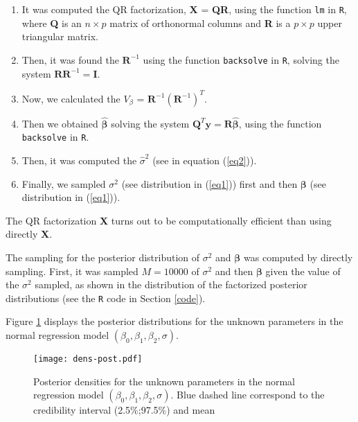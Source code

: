 \documentclass[a4paper, 11pt]{article}
\begin{document}
\begin{enumerate}
\item It was computed the QR factorization, \textbf{X} = \textbf{Q}\textbf{R}, using the function \texttt{lm} in \texttt{R}, where \textbf{Q} is an $n \times p$ matrix of orthonormal columns and \textbf{R} is a $p \times p$ upper triangular matrix.
\item Then, it was found the $\textbf{R}^{-1}$ using the function \texttt{backsolve} in \texttt{R}, solving the system $\textbf{R}\textbf{R}^{-1} = \textbf{I}$.
\item Now, we calculated the $V_\beta$ = $\textbf{R}^{-1} (\textbf{R}^{-1})^T$.
\item Then we obtained $\boldsymbol{\hat{\beta}}$ solving the system $\textbf{Q}^T\textbf{y} = \textbf{R}\boldsymbol{\hat{\beta}}$, using the function \texttt{backsolve} in \texttt{R}.
\item Then, it was computed the $\hat{\sigma}^2$ (see in equation (\ref{eq2})).
\item Finally, we sampled $\sigma^2$ (see distribution in (\ref{eq1})) first and then $\boldsymbol{\beta}$ (see distribution in (\ref{eq1})).
\end{enumerate}

The QR factorization \textbf{X} turns out to be computationally efficient than using directly \textbf{X}.

The sampling for the posterior distribution of $\sigma^2$ and $\boldsymbol{\beta}$ was computed by directly sampling. First, it was sampled $M=10000$ of $\sigma^2$ and then $\boldsymbol{\beta}$ given the value of the $\sigma^2$ sampled, as shown in the distribution of the factorized posterior distributions (see the \texttt{R} code in Section \ref{code}).


Figure \ref{Dens-Post} displays the posterior distributions for the unknown parameters in the normal regression model $(\beta_0, \beta_1, \beta_2, \sigma)$.
\begin{figure}[H]
\centering
\texttt{[image: dens-post.pdf]}  
\caption{Posterior densities for the unknown parameters in the normal regression model $(\beta_0, \beta_1, \beta_2, \sigma)$. Blue dashed line correspond to the credibility interval (2.5\%;97.5\%) and mean}
\label{Dens-Post}
\end{figure}
\end{document}
